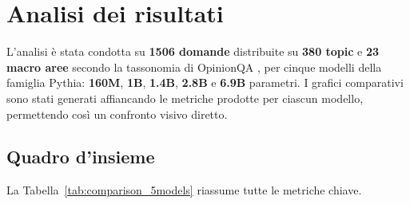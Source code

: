 \documentclass[../relazione.tex]{subfiles}
\begin{document}
\section{Analisi dei risultati}
\label{sec:risultati}
L'analisi è stata condotta su \textbf{1506 domande} distribuite su \textbf{380 topic} e \textbf{23 macro aree} secondo la tassonomia di OpinionQA \cite{santurkar2023whose}, per cinque modelli della famiglia Pythia: \textbf{160M}, \textbf{1B}, \textbf{1.4B}, \textbf{2.8B} e \textbf{6.9B} parametri. I grafici comparativi sono stati generati affiancando le metriche prodotte per ciascun modello, permettendo così un confronto visivo diretto.

\subsection{Quadro d'insieme}
\label{sec:comparison_table}

La Tabella~\ref{tab:comparison_5models} riassume tutte le metriche chiave.







\addtocounter{table}{-1}
\end{document}
